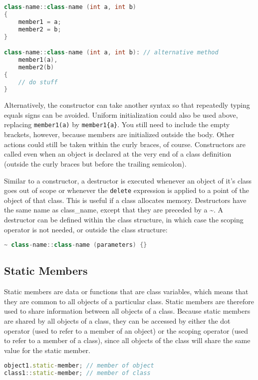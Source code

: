 \documentclass[10pt]{article}
\begin{document}
\begin{lstlisting}[language=C++]
class-name::class-name (int a, int b)
{
    member1 = a;
    member2 = b;
}

class-name::class-name (int a, int b): // alternative method
    member1(a),
    member2(b)
{
    // do stuff
}
\end{lstlisting}

Alternatively, the constructor can take another syntax so that repeatedly typing equals signs can be avoided. Uniform initialization could also be used above, replacing \texttt{member1(a)} by \texttt{member1\{a\}}. You still need to include the empty brackets, however, because members are initialized outside the body. Other actions could still be taken within the curly braces, of course. Constructors are called even when an object is declared at the very end of a class definition (outside the curly braces but before the trailing semicolon). 

Similar to a constructor, a destructor is executed whenever an object of it's class goes out of scope or whenever the \texttt{delete} expression is applied to a point of the object of that class. This is useful if a class allocates memory. Destructors have the same name as class\_name, except that they are preceded by a \textasciitilde. A destructor can be defined within the class structure, in which case the scoping operator is not needed, or outside the class structure:

\begin{lstlisting}[language=C++]
~ class-name::class-name (parameters) {}
\end{lstlisting}

\subsection{Static Members}

Static members are data or functions that are class variables, which means that they are common to all objects of a particular class. Static members are therefore used to share information between all objects of a class. Because static members are shared by all objects of a class, they can be accessed by either the dot operator (used to refer to a member of an object) or the scoping operator (used to refer to a member of a class), since all objects of the class will share the same value for the static member.

\begin{lstlisting}[language=C++]
object1.static-member; // member of object
class1::static-member; // member of class
\end{lstlisting}
\end{document}
